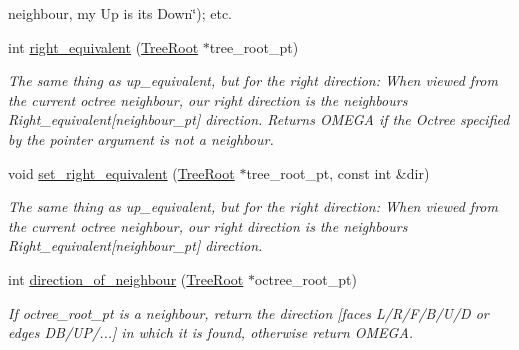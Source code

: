 \begin{DoxyCompactItemize}
\begin{DoxyCompactList}
neighbour, my Up is its Down\char`\"{}); etc. \end{DoxyCompactList}\item 
int \hyperlink{classoomph_1_1OcTreeRoot_a497950cb0812be6a95be8af658a03fb6}{right\+\_\+equivalent} (\hyperlink{classoomph_1_1TreeRoot}{Tree\+Root} $\ast$tree\+\_\+root\+\_\+pt)
\begin{DoxyCompactList}\small\item\em The same thing as up\+\_\+equivalent, but for the right direction\+: When viewed from the current octree neighbour, our right direction is the neighbour\textquotesingle{}s Right\+\_\+equivalent\mbox{[}neighbour\+\_\+pt\mbox{]} direction. Returns O\+M\+E\+GA if the Octree specified by the pointer argument is not a neighbour. \end{DoxyCompactList}\item 
void \hyperlink{classoomph_1_1OcTreeRoot_aa462fe159838307aee0870ad089836f5}{set\+\_\+right\+\_\+equivalent} (\hyperlink{classoomph_1_1TreeRoot}{Tree\+Root} $\ast$tree\+\_\+root\+\_\+pt, const int \&dir)
\begin{DoxyCompactList}\small\item\em The same thing as up\+\_\+equivalent, but for the right direction\+: When viewed from the current octree neighbour, our right direction is the neighbour\textquotesingle{}s Right\+\_\+equivalent\mbox{[}neighbour\+\_\+pt\mbox{]} direction. \end{DoxyCompactList}\item 
int \hyperlink{classoomph_1_1OcTreeRoot_a6b6730957601b05b991ffc9972d31f8b}{direction\+\_\+of\+\_\+neighbour} (\hyperlink{classoomph_1_1TreeRoot}{Tree\+Root} $\ast$octree\+\_\+root\+\_\+pt)
\begin{DoxyCompactList}\small\item\em If octree\+\_\+root\+\_\+pt is a neighbour, return the direction \mbox{[}faces L/\+R/\+F/\+B/\+U/D or edges D\+B/\+U\+P/...\mbox{]} in which it is found, otherwise return O\+M\+E\+GA. \end{DoxyCompactList}\end{DoxyCompactItemize}
